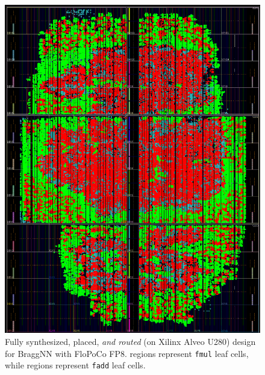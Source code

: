 \begin{figure}
	\includegraphics[width=\columnwidth]{figures/correct_schedule_routed}
	\caption{Fully synthesized, placed, \emph{and routed} (on Xilinx Alveo U280) design for BraggNN with FloPoCo FP8. \crule[red]{0.25cm}{0.25cm} regions represent \texttt{fmul} leaf cells, while \crule[green]{0.25cm}{0.25cm} regions represent \texttt{fadd} leaf cells.}\label{fig:placed_braggnn}
\end{figure}

